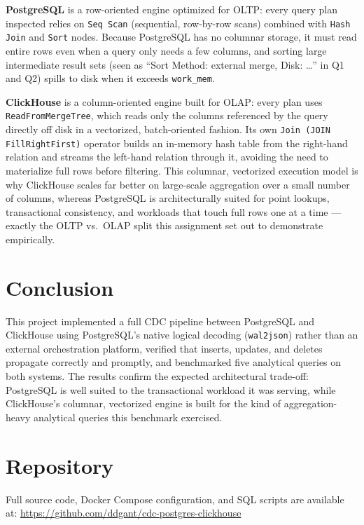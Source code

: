 \documentclass[11pt]{article}
\begin{document}
\textbf{PostgreSQL} is a row-oriented engine optimized for OLTP: every
query plan inspected relies on \texttt{Seq Scan} (sequential, row-by-row
scans) combined with \texttt{Hash Join} and \texttt{Sort} nodes. Because
PostgreSQL has no columnar storage, it must read entire rows even when a
query only needs a few columns, and sorting large intermediate result sets
(seen as ``Sort Method: external merge, Disk: \dots'' in Q1 and Q2) spills
to disk when it exceeds \texttt{work\_mem}.

\textbf{ClickHouse} is a column-oriented engine built for OLAP: every plan
uses \texttt{ReadFromMergeTree}, which reads only the columns referenced
by the query directly off disk in a vectorized, batch-oriented fashion.
Its own \texttt{Join (JOIN FillRightFirst)} operator builds an in-memory
hash table from the right-hand relation and streams the left-hand
relation through it, avoiding the need to materialize full rows before
filtering. This columnar, vectorized execution model is why ClickHouse
scales far better on large-scale aggregation over a small number of
columns, whereas PostgreSQL is architecturally suited for point lookups,
transactional consistency, and workloads that touch full rows one at a
time --- exactly the OLTP vs.\ OLAP split this assignment set out to
demonstrate empirically.

\section{Conclusion}

This project implemented a full CDC pipeline between PostgreSQL and
ClickHouse using PostgreSQL's native logical decoding (\texttt{wal2json})
rather than an external orchestration platform, verified that inserts,
updates, and deletes propagate correctly and promptly, and benchmarked
five analytical queries on both systems. The results confirm the expected
architectural trade-off: PostgreSQL is well suited to the transactional
workload it was serving, while ClickHouse's columnar, vectorized engine is
built for the kind of aggregation-heavy analytical queries this benchmark
exercised.

\section*{Repository}
Full source code, Docker Compose configuration, and SQL scripts are
available at: \url{https://github.com/ddgant/cdc-postgres-clickhouse}
\end{document}
